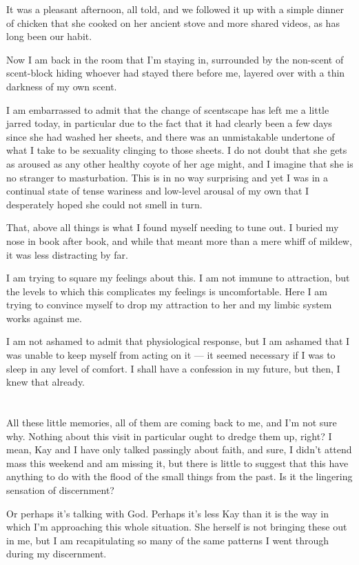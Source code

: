 It was a pleasant afternoon, all told, and we followed it up with a simple dinner of chicken that she cooked on her ancient stove and more shared videos, as has long been our habit.

Now I am back in the room that I'm staying in, surrounded by the non-scent of scent-block hiding whoever had stayed there before me, layered over with a thin darkness of my own scent.

I am embarrassed to admit that the change of scentscape has left me a little jarred today, in particular due to the fact that it had clearly been a few days since she had washed her sheets, and there was an unmistakable undertone of what I take to be sexuality clinging to those sheets. I do not doubt that she gets as aroused as any other healthy coyote of her age might, and I imagine that she is no stranger to masturbation. This is in no way surprising and yet I was in a continual state of tense wariness and low-level arousal of my own that I desperately hoped she could not smell in turn.

That, above all things is what I found myself needing to tune out. I buried my nose in book after book, and while that meant more than a mere whiff of mildew, it was less distracting by far.

I am trying to square my feelings about this. I am not immune to attraction, but the levels to which this complicates my feelings is uncomfortable. Here I am trying to convince myself to drop my attraction to her and my limbic system works against me.

I am not ashamed to admit that physiological response, but I am ashamed that I was unable to keep myself from acting on it --- it seemed necessary if I was to sleep in any level of comfort. I shall have a confession in my future, but then, I knew that already.

\section{}

All these little memories, all of them are coming back to me, and I'm not sure why. Nothing about this visit in particular ought to dredge them up, right? I mean, Kay and I have only talked passingly about faith, and sure, I didn't attend mass this weekend and am missing it, but there is little to suggest that this have anything to do with the flood of the small things from the past. Is it the lingering sensation of discernment?

Or perhaps it's talking with God. Perhaps it's less Kay than it is the way in which I'm approaching this whole situation. She herself is not bringing these out in me, but I am recapitulating so many of the same patterns I went through during my discernment.

